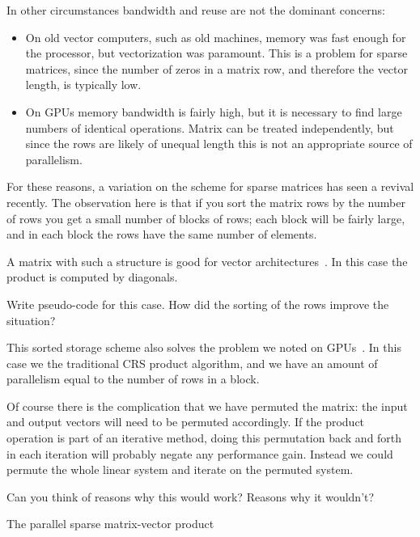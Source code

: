 In other circumstances bandwidth and reuse are not the dominant concerns:
\begin{itemize}
\item On old vector computers, such as old  machines,
  memory was fast enough for the processor, but vectorization was
  paramount. This is a problem for sparse matrices, since the number
  of zeros in a matrix row, and therefore the vector length, is
  typically low.
\item On \acp{GPU} memory bandwidth is fairly high, but it is
  necessary to find large numbers of identical operations. Matrix can
  be treated independently, but since the rows are likely of unequal
  length this is not an appropriate source of parallelism.
\end{itemize}
For these reasons, a variation on the 
scheme for sparse matrices has seen a revival
recently. The observation here is that
if you sort the matrix rows by the number of rows you get a small
number of blocks of rows; each block will be fairly large, and in each
block the rows have the same number of elements.

A matrix with such a structure is good for vector
architectures~\cite{DAzevedo2005:vector-mvp}. In this case the product
is computed by diagonals.
\begin{exercise}
  Write pseudo-code for this case. How did the sorting of the rows
  improve the situation?
\end{exercise}

This sorted storage scheme also solves the problem we noted on
\acp{GPU}~\cite{Bolz:GPUsparse}. In this case we the traditional
\ac{CRS} product algorithm, and we have an amount of parallelism equal
to the number of rows in a block.

Of course there is the complication that we have permuted the matrix:
the input and output vectors will need to be permuted accordingly. If
the product operation is part of an iterative method, doing this
permutation back and forth in each iteration will probably negate any
performance gain. Instead we could permute the whole linear system and
iterate on the permuted system.
\begin{exercise}
  Can you think of reasons why this would work? Reasons why it wouldn't?
\end{exercise}

 {The parallel sparse matrix-vector product}


